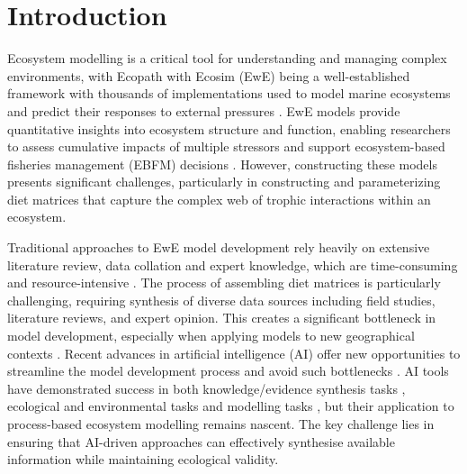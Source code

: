 \section{Introduction}

Ecosystem modelling is a critical tool for understanding and managing complex environments, with Ecopath with Ecosim (EwE) being a well-established framework with thousands of implementations used to model marine ecosystems and predict their responses to external pressures \citep{Christensen2004, Colleter2015}. EwE models provide quantitative insights into ecosystem structure and function, enabling researchers to assess cumulative impacts of multiple stressors and support ecosystem-based fisheries management (EBFM) decisions \citep{Coll2015, Villasante2016,Geary2020}. However, constructing these models presents significant challenges, particularly in constructing and parameterizing diet matrices that capture the complex web of trophic interactions within an ecosystem.

Traditional approaches to EwE model development rely heavily on extensive literature review, data collation and expert knowledge, which are time-consuming and resource-intensive \citep{Holden2024a}. The process of assembling diet matrices is particularly challenging, requiring synthesis of diverse data sources including field studies, literature reviews, and expert opinion. This creates a significant bottleneck in model development, especially when applying models to new geographical contexts \citep{Holden2024b}. Recent advances in artificial intelligence (AI) offer new opportunities to streamline the model development process and avoid such bottlenecks \citep{spilliasfuture}. AI tools have demonstrated success in both knowledge/evidence synthesis tasks \citep{spillias2024human,keck2025extracting,castro2024large,spillias2024evaluating,Zheng2023,nugraha2024traditional}, ecological and environmental tasks \citep{Fernandes2024,Li2024,Chen2024,dorm2025large,Noleto2024} and modelling tasks \citep{Lapeyrolerie2022, Tuia2022, Karniadakis2021}, but their application to process-based ecosystem modelling remains nascent. The key challenge lies in ensuring that AI-driven approaches can effectively synthesise available information while maintaining ecological validity.


